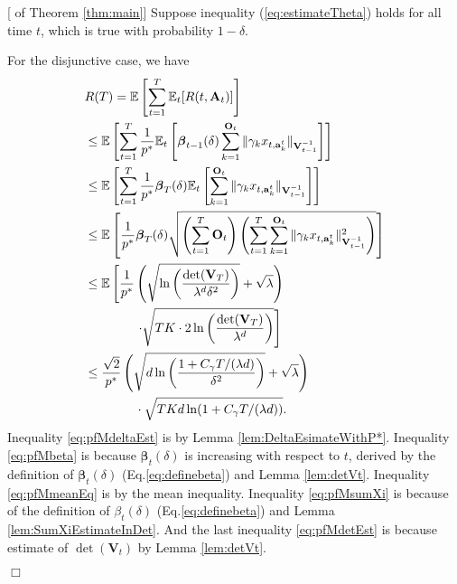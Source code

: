 \documentclass{article}
\newcommand{\bbeta}{\boldsymbol{\beta}}
\newcommand{\EE}{\mathbb{E}}
\newcommand{\bA}{\mathbf{A}}
\newcommand{\ba}{\mathbf{a}}
\newcommand{\bO}{\mathbf{O}}
\newcommand{\bV}{\mathbf{V}}
\newcommand{\norm}[1]{\| #1 \|}
\newenvironment{proof}{\noindent {\textbf{Proof. }}}{$\Box$ \medskip}
\begin{document}
\begin{proof}[ of Theorem \ref{thm:main}]
Suppose inequality (\ref{eq:estimateTheta}) holds for all time $t$, which is
	true with probability $1-\delta$. 

For the disjunctive case, we have
\begin{align}
&R(T) = \EE \left[\sum_{t=1}^{T} \EE_{t}[R(t, \bA_t)] \right] \notag\\
&\leq \EE\left[\sum_{t=1}^{T} \frac{1}{p^*} \EE_t \left[\bbeta_{t-1}(\delta) \sum_{k=1}^{\bO_t}\norm{\gamma_k x_{t,\ba_k^t}}_{\bV_{t-1}^{-1}}\right] \right] \label{eq:pfMdeltaEst}\\
&\leq \EE\left[\sum_{t=1}^{T} \frac{1}{p^*} \bbeta_{T}(\delta) \EE_t \left[ \sum_{k=1}^{\bO_t}\norm{\gamma_k x_{t,\ba_k^t}}_{\bV_{t-1}^{-1}}\right] \right] \label{eq:pfMbeta}\\
&\leq \EE \left[\frac{1}{p^*} \bbeta_T(\delta) \sqrt{\left(\sum_{t=1}^{T} \bO_t\right) \left( \sum_{t=1}^{T} \sum_{k=1}^{\bO_t}\norm{\gamma_k x_{t,\ba_k^t}}_{\bV_{t-1}^{-1}}^2 \right)}
	\right ]  \label{eq:pfMmeanEq}\\
&\leq \EE\left[\frac{1}{p^*} \left( \sqrt{ \ln \left( \frac{\det(\bV_T)}{\lambda^d \delta^2} \right)} + \sqrt{\lambda} \right) \right. \notag\\
& \left. \qquad \qquad \cdot \sqrt{TK \cdot 2\ln \left(\frac{\det(\bV_T)}{\lambda^d} \right)} \right] \label{eq:pfMsumXi}\\
&\leq \frac{\sqrt{2}}{p^*} \left(\sqrt{ d \ln \left( \frac{1 + C_\gamma T/(\lambda d)}{\delta^2} \right) } + \sqrt{\lambda} \right) \notag\\
&\qquad \qquad \cdot \sqrt{TKd\ln(1 + C_\gamma T/(\lambda d))}. \label{eq:pfMdetEst}
\end{align}
Inequality \eqref{eq:pfMdeltaEst} is by Lemma \ref{lem:DeltaEsimateWithP*}. 
Inequality \eqref{eq:pfMbeta} is because $\bbeta_{t}(\delta)$ is increasing with respect to $t$, derived by the definition of $\bbeta_t(\delta)$ 
	(Eq.\eqref{eq:definebeta}) and Lemma \ref{lem:detVt}. 
Inequality \eqref{eq:pfMmeanEq} is by the mean inequality. 
Inequality \eqref{eq:pfMsumXi} is because of the definition of $\beta_t(\delta)$ (Eq.\eqref{eq:definebeta}) 
	and Lemma \ref{lem:SumXiEstimateInDet}. 
And the last inequality \eqref{eq:pfMdetEst} is because estimate of $\det(\bV_t)$ by Lemma \ref{lem:detVt}.


\end{proof}
\end{document}
